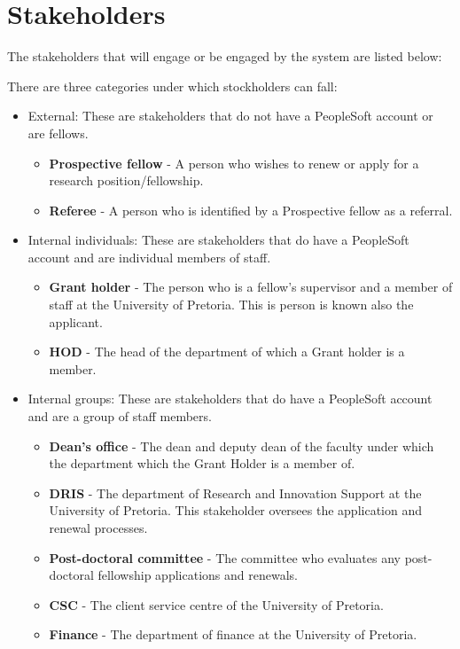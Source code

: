 \documentclass[12pt]{article}
\begin{document}
	\vspace{0.5in}
	
	
	\newpage
		\section{Stakeholders} %
		\vspace{0.2in}
		
		The stakeholders that will engage or be engaged by the system are listed below:
		
		There are three categories under which stockholders can fall:
		\begin{itemize}					
			\item External:
			These are stakeholders that do not have a PeopleSoft account or are fellows.
			\begin{itemize}		
				\item \textbf{Prospective fellow} - A person who wishes to renew or apply for a research position/fellowship.
				\item \textbf{Referee} - A person who is identified by a Prospective fellow as a referral.
			\end{itemize}
			
			\item Internal individuals:
			These are stakeholders that do have a PeopleSoft account and are individual members of staff.
			\begin{itemize}	
				\item \textbf{Grant holder} - The person who is a fellow's supervisor and a member of staff at the University of Pretoria. This is person is known also the applicant.
				\item \textbf{HOD} - The head of the department of which a Grant holder is a member.					
			\end{itemize}
			\item Internal groups:
			These are stakeholders that do have a PeopleSoft account and are a group of staff members.
			\begin{itemize}	
				\item \textbf{Dean's office} - The dean and deputy dean of the faculty under which the department which the Grant Holder is a member of.
				\item \textbf{DRIS} - The department of Research and Innovation Support at the University of Pretoria. This stakeholder oversees the application and renewal processes.
				\item \textbf{Post-doctoral committee} - The committee who evaluates any post-doctoral fellowship applications and renewals.
				\item \textbf{CSC} - The client service centre of the University of Pretoria.
				\item \textbf{Finance} - The department of finance at the University of Pretoria.	
			\end{itemize}
		\end{itemize}
		\vspace{0.5in}
	
\end{document}
